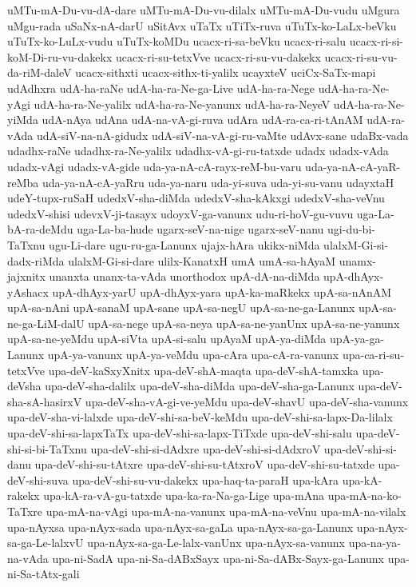 {uMTu-mA-Du-vu-dA-dare
uMTu-mA-Du-vu-dilalx
uMTu-mA-Du-vudu
uMgura
uMgu-rada
uSaNx-nA-darU
uSitAvx
uTaTx
uTiTx-ruva
uTuTx-ko-LaLx-beVku
uTuTx-ko-LuLx-vudu
uTuTx-koMDu
ucacx-ri-sa-beVku
ucacx-ri-salu
ucacx-ri-si-koM-Di-ru-vu-dakekx
ucacx-ri-su-tetxVve
ucacx-ri-su-vu-dakekx
ucacx-ri-su-vu-da-riM-daleV
ucacx-sithxti
ucacx-sithx-ti-yalilx
ucayxteV
uciCx-SaTx-mapi
udAdhxra
udA-ha-raNe
udA-ha-ra-Ne-ga-Live
udA-ha-ra-Nege
udA-ha-ra-Ne-yAgi
udA-ha-ra-Ne-yalilx
udA-ha-ra-Ne-yanunx
udA-ha-ra-NeyeV
udA-ha-ra-Ne-yiMda
udA-nAya
udAna
udA-na-vA-gi-ruva
udAra
udA-ra-ca-ri-tAnAM
udA-ra-vAda
udA-siV-na-nA-gidudx
udA-siV-na-vA-gi-ru-vaMte
udAvx-sane
udaBx-vada
udadhx-raNe
udadhx-ra-Ne-yalilx
udadhx-vA-gi-ru-tatxde
udadx
udadx-vAda
udadx-vAgi
udadx-vA-gide
uda-ya-nA-cA-rayx-reM-bu-varu
uda-ya-nA-cA-yaR-reMba
uda-ya-nA-cA-yaRru
uda-ya-naru
uda-yi-suva
uda-yi-su-vanu
udayxtaH
udeY-tupx-ruSaH
udedxV-sha-diMda
udedxV-sha-kAkxgi
udedxV-sha-veVnu
udedxV-shisi
udevxV-ji-tasayx
udoyxV-ga-vanunx
udu-ri-hoV-gu-vuvu
uga-La-bA-ra-deMdu
uga-La-ba-hude
ugarx-seV-na-nige
ugarx-seV-nanu
ugi-du-bi-TaTxnu
ugu-Li-dare
ugu-ru-ga-Lanunx
ujajx-hAra
ukikx-niMda
ulalxM-Gi-si-dadx-riMda
ulalxM-Gi-si-dare
ulilx-KanatxH
umA
umA-sa-hAyaM
unamx-jajxnitx
unanxta
unanx-ta-vAda
unorthodox
upA-dA-na-diMda
upA-dhAyx-yAshacx
upA-dhAyx-yarU
upA-dhAyx-yara
upA-ka-maRkekx
upA-sa-nAnAM
upA-sa-nAni
upA-sanaM
upA-sane
upA-sa-negU
upA-sa-ne-ga-Lanunx
upA-sa-ne-ga-LiM-dalU
upA-sa-nege
upA-sa-neya
upA-sa-ne-yanUnx
upA-sa-ne-yanunx
upA-sa-ne-yeMdu
upA-siVta
upA-si-salu
upAyaM
upA-ya-diMda
upA-ya-ga-Lanunx
upA-ya-vanunx
upA-ya-veMdu
upa-cAra
upa-cA-ra-vanunx
upa-ca-ri-su-tetxVve
upa-deV-kaSxyXnitx
upa-deV-shA-maqta
upa-deV-shA-tamxka
upa-deVsha
upa-deV-sha-dalilx
upa-deV-sha-diMda
upa-deV-sha-ga-Lanunx
upa-deV-sha-sA-hasirxV
upa-deV-sha-vA-gi-ve-yeMdu
upa-deV-shavU
upa-deV-sha-vanunx
upa-deV-sha-vi-lalxde
upa-deV-shi-sa-beV-keMdu
upa-deV-shi-sa-lapx-Da-lilalx
upa-deV-shi-sa-lapxTaTx
upa-deV-shi-sa-lapx-TiTxde
upa-deV-shi-salu
upa-deV-shi-si-bi-TaTxnu
upa-deV-shi-si-dAdxre
upa-deV-shi-si-dAdxroV
upa-deV-shi-si-danu
upa-deV-shi-su-tAtxre
upa-deV-shi-su-tAtxroV
upa-deV-shi-su-tatxde
upa-deV-shi-suva
upa-deV-shi-su-vu-dakekx
upa-haq-ta-paraH
upa-kAra
upa-kA-rakekx
upa-kA-ra-vA-gu-tatxde
upa-ka-ra-Na-ga-Lige
upa-mAna
upa-mA-na-ko-TaTxre
upa-mA-na-vAgi
upa-mA-na-vanunx
upa-mA-na-veVnu
upa-mA-na-vilalx
upa-nAyxsa
upa-nAyx-sada
upa-nAyx-sa-gaLa
upa-nAyx-sa-ga-Lanunx
upa-nAyx-sa-ga-Le-lalxvU
upa-nAyx-sa-ga-Le-lalx-vanUnx
upa-nAyx-sa-vanunx
upa-na-ya-na-vAda
upa-ni-SadA
upa-ni-Sa-dABxSayx
upa-ni-Sa-dABx-Sayx-ga-Lanunx
upa-ni-Sa-tAtx-gali
}
